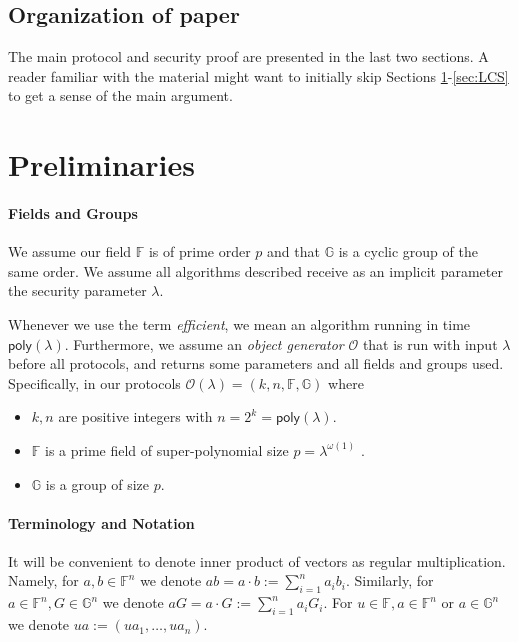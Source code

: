 \documentclass[11pt]{article} %
\newcommand{\G}{\ensuremath{{\mathbb G}}\xspace}
\newcommand{\F}{\ensuremath{\mathbb F}\xspace}
\newcommand{\defeq}{:=}
\newcommand{\polysofdeg}[1]{\ensuremath{\F_{< #1}[X]}\xspace}
\newcommand{\obgen}{\ensuremath{\mathcal O}\xspace}
\newcommand{\f}{\ensuremath{\F}\xspace}
\newcommand{\fn}{\ensuremath{\F^n}\xspace}
\newcommand{\gn}{\ensuremath{\G^n}\xspace}
\newcommand{\poly}{\ensuremath{\mathsf{poly(\lambda)}}\xspace}
\begin{document}
\subsection{Organization of paper}
The main protocol and security proof are presented in the last two sections. A reader familiar with the material might want to initially skip Sections \ref{sec:prelim}-\ref{sec:LCS} to get a sense of the main argument.

\section{Preliminaries}\label{sec:prelim}
\paragraph{Fields and Groups}
We assume our field \F is of prime order $p$ and that \G is a cyclic group of the same order.
We assume all algorithms described receive as an implicit parameter the security parameter $\lambda$.

Whenever we use the term \emph{efficient}, we mean an algorithm running in time \poly. Furthermore,
we assume an \emph{object generator} \obgen that is run with input $\lambda$ before all protocols, and returns some parameters and all fields and groups used. Specifically, in our protocols $\obgen(\lambda) = (k,n,\F, \G)$ where
\begin{itemize}
\item $k,n$ are positive integers with $n=2^k=\poly$.
\item \F is a prime field of super-polynomial size $p = \lambda^{\omega(1)}$
.
\item $\G$ is a group of size $p$.
\end{itemize}
\paragraph{Terminology and Notation}
It will be convenient to denote inner product of vectors as regular multiplication. Namely,
for $a,b\in \fn$ we denote $ab=a\cdot b \defeq \sum_{i=1}^n a_i b_i$.
Similarly, for $a\in \fn, G\in \gn$ we denote  $aG=a\cdot G \defeq \sum_{i=1}^n a_i G_i$.
For $u\in \f, a \in \fn$ or $a\in \gn$ we denote $ua\defeq (ua_1,\ldots, ua_n)$.
\end{document}
